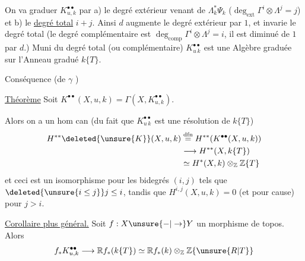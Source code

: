 On va graduer $K_{u,k}^{\bullet\bullet}$ par a) le degré extérieur venant de $\Lambda_k^*\Psi_k$ ($\deg_{\mathrm{ext}}\Gamma^i\otimes\Lambda^j=j$) et b) le \uline{degré total} $i+j$. Ainsi $d$ augmente le degré extérieur par $1$, et invarie le degré total  (le degré complémentaire est $\deg_{\mathrm{comp}}\Gamma^i\otimes\Lambda^j=i$, il est diminué de $1$ par $d$.) Muni du degré total (ou complémentaire) $K_{u\,k}^{\bullet\bullet}$ est une Algèbre graduée sur l'Anneau gradué $k\{T\}$.

Conséquence (de $\gamma$ )

\uline{Théorème} Soit $K^{\bullet\bullet}(X,u,k)=\Gamma(X,K_{u,k}^{\bullet\bullet})$.

Alors on a un hom can (du fait que $K_{u\,k}^{\bullet\bullet}$  est une résolution de $k\{T\}$)
\[
\begin{aligned}
H^{**}\deleted{\unsure{K}}(X,u,k)&\overset{\mathrm{dfn}}{=}H^{**}(K^{\bullet\bullet}(X,u,k))\\
&\longrightarrow H^{**}(X,k\{T\})\\
&\simeq H^*(X,k)\otimes_{\mathbb Z}\mathbb Z\{T\}
\end{aligned}
\]
et ceci est un isomorphisme pour les bidegrés $(i,j)$ tels que $\deleted{\unsure{i\leq j}}j\leq i$, tandis que $H^{i,j}(X,u,k)=0$ (et pour cause) pour $j>i$.


\uline{Corollaire plus général.} Soit $f:X\unsure{\mathord{-}|\to}Y$ un morphisme de topos. Alors
\[
f_*K_{u,k}^{\bullet\bullet}\longrightarrow\mathbb R f_*(k\{T\})\simeq\mathbb R f_*(k)\otimes_{\mathbb Z}\mathbb Z\{\unsure{R|T}\}
\]

